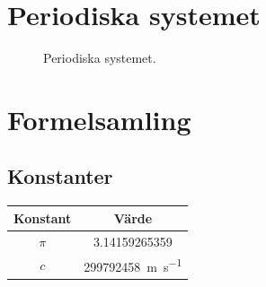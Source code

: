 \section{Periodiska systemet}
\vfill
\begin{figure}[h!]
    \centering

    \caption{Periodiska systemet.}
\end{figure}
\vfill
\pagebreak

\section{Formelsamling}

\subsection{Konstanter}
\begin{tabular}{c | c}
    \textbf{Konstant} & \textbf{Värde} \\ \toprule
    $\pi$ & \num{3.14159265359} \\
    $c$ & \SI{299792458}{\m\per\s} \\

\end{tabular}